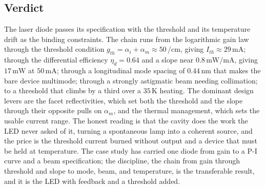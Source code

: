 \subsection{Verdict}

The laser diode passes its specification with the threshold and its
temperature drift as the binding constraints. The chain runs from the
logarithmic gain law through the threshold condition $g_{th} = \alpha_i +
\alpha_m \approx 50\,\si{\per\centi\meter}$, giving $I_{th} \approx
29\,\si{\milli\ampere}$; through the differential efficiency $\eta_d =
0.64$ and a slope near $0.8\,\si{\milli\watt\per\milli\ampere}$, giving
$17\,\si{\milli\watt}$ at $50\,\si{\milli\ampere}$; through a longitudinal
mode spacing of $0.44\,\si{\nano\meter}$ that makes the bare device
multimode; through a strongly astigmatic beam needing collimation; to a
threshold that climbs by a third over a $35\,\si{\kelvin}$ heating. The
dominant design levers are the facet reflectivities, which set both the
threshold and the slope through their opposite pulls on $\alpha_m$, and
the thermal management, which sets the usable current range. The honest
reading is that the cavity does the work the LED never asked of it,
turning a spontaneous lamp into a coherent source, and the price is the
threshold current burned without output and a device that must be held at
temperature. The case study has carried one diode from gain to a P-I
curve and a beam specification; the discipline, the chain from gain
through threshold and slope to mode, beam, and temperature, is the
transferable result, and it is the LED with feedback and a threshold
added.

